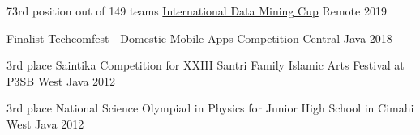 




\begin{cvhonors}


\cvhonor
{73rd position out of 149 teams} %
{\href{https://www.data-mining-cup.com/}{International Data Mining Cup}} %
{Remote} %
{2019} %








\cvhonor
{Finalist} %
{\href{https://www.techcomfest.ukmpcc.org/}{Techcomfest}---Domestic Mobile Apps Competition} %
{Central Java} %
{2018} %


\cvhonor
{3rd place} %
{Saintika Competition for XXIII Santri Family Islamic Arts Festival at P3SB} %
{West Java} %
{2012} %


\cvhonor
{3rd place} %
{National Science Olympiad in Physics for Junior High School in Cimahi} %
{West Java} %
{2012} %


\end{cvhonors}
